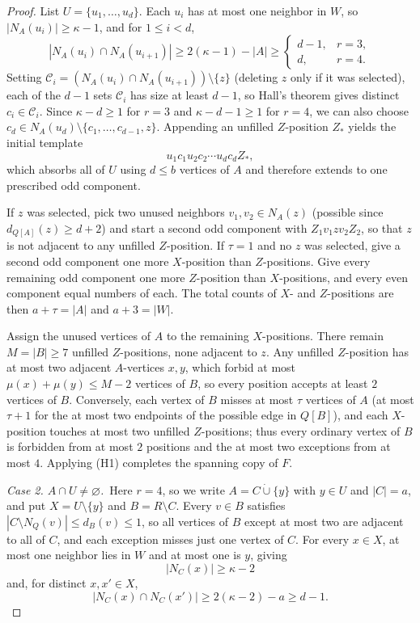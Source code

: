 \documentclass[10pt]{article}
\theoremstyle{compactplain}
\theoremstyle{remark}\newtheorem{remark}[theorem]{Remark}
\begin{document}
\begin{proof}
List $U=\{u_1,\ldots,u_d\}$. Each $u_i$ has at most one neighbor in $W$,
so $|N_A(u_i)|\ge\kappa-1$, and for $1\le i<d$,
\[
 |N_A(u_i)\cap N_A(u_{i+1})|\ge2(\kappa-1)-|A|
 \ge\begin{cases}d-1, & r=3,\\ d, & r=4.\end{cases}
\]
Setting $\mathcal{C}_i=(N_A(u_i)\cap N_A(u_{i+1}))\setminus\{z\}$
(deleting $z$ only if it was selected), each of the $d-1$ sets
$\mathcal{C}_i$ has size at least $d-1$, so Hall's theorem gives
distinct $c_i\in\mathcal{C}_i$. Since $\kappa-d\ge1$ for $r=3$ and
$\kappa-d-1\ge1$ for $r=4$, we can also choose
$c_d\in N_A(u_d)\setminus\{c_1,\ldots,c_{d-1},z\}$. Appending an
unfilled $Z$-position $Z_\ast$ yields the initial template
\begin{equation}\label{eq:outside-path}
 u_1c_1u_2c_2\cdots u_dc_dZ_\ast,
\end{equation}
which absorbs all of $U$ using $d\le b$ vertices of $A$ and therefore
extends to one prescribed odd component.

If $z$ was selected, pick two unused neighbors $v_1,v_2\in N_A(z)$
(possible since $d_{Q[A]}(z)\ge d+2$) and start a second odd component
with $Z_1v_1zv_2Z_2$, so that $z$ is not adjacent to any unfilled
$Z$-position. If $\tau=1$ and no $z$ was selected, give a second odd
component one more $X$-position than $Z$-positions. Give every remaining
odd component one more $Z$-position than $X$-positions, and every even
component equal numbers of each. The total counts of $X$- and
$Z$-positions are then $a+\tau=|A|$ and $a+3=|W|$.

Assign the unused vertices of $A$ to the remaining $X$-positions. There
remain $M=|B|\ge7$ unfilled $Z$-positions, none adjacent to $z$. Any
unfilled $Z$-position has at most two adjacent $A$-vertices $x,y$, which
forbid at most $\mu(x)+\mu(y)\le M-2$ vertices of $B$, so every position
accepts at least $2$ vertices of $B$. Conversely, each vertex of $B$
misses at most $\tau$ vertices of $A$ (at most $\tau+1$ for the at most
two endpoints of the possible edge in $Q[B]$), and each $X$-position
touches at most two unfilled $Z$-positions; thus every ordinary vertex
of $B$ is forbidden from at most $2$ positions and the at most two
exceptions from at most $4$. Applying (H1) completes the spanning copy
of $F$.

\medskip\noindent\emph{Case 2. $A\cap U\ne\varnothing$.}\ 
Here $r=4$, so we write $A=C\dot\cup\{y\}$ with $y\in U$ and $|C|=a$,
and put $X=U\setminus\{y\}$ and $B=R\setminus C$. Every $v\in B$
satisfies $|C\setminus N_Q(v)|\le d_B(v)\le1$, so all vertices of $B$
except at most two are adjacent to all of $C$, and each exception misses
just one vertex of $C$. For every $x\in X$, at most one neighbor lies in
$W$ and at most one is $y$, giving
\begin{equation}\label{eq:X-degree}
 |N_C(x)|\ge\kappa-2
\end{equation}
and, for distinct $x,x'\in X$,
\begin{equation}\label{eq:X-common}
 |N_C(x)\cap N_C(x')|\ge2(\kappa-2)-a\ge d-1.
\end{equation}


\end{proof}
\end{document}
